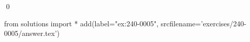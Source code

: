 
\begin{ex} 
  \label{ex:240-0005}
  
  \qed
\end{ex} 
\begin{python0}
from solutions import *
add(label="ex:240-0005",
    srcfilename='exercises/240-0005/answer.tex') 
\end{python0}
